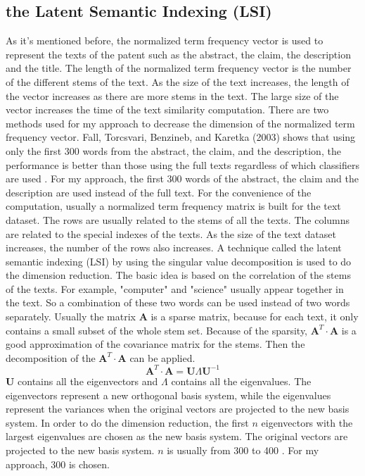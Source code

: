 \subsection{the Latent Semantic Indexing (LSI)}
As it's mentioned before, the normalized term frequency vector is used to represent the texts of the patent such as the abstract, the claim, the description and the title. The length of the normalized term frequency vector is the number of the different stems of the text. As the size of the text increases, the length of the vector increases as there are more stems in the text. The large size of the vector increases the time of the text similarity computation. There are two methods used for my approach to decrease the dimension of  the normalized term frequency vector. Fall, Torcsvari, Benzineb, and Karetka (2003) shows that  using only the first 300 words from the abstract, the claim, and the description, the performance is better than those using the full texts regardless of which classifiers are used \cite{tseng2007text}. For my approach, the first 300 words of the abstract, the claim and the description are used instead of the full text. For the convenience of the computation, usually a normalized term frequency matrix is built for the text dataset. The rows are usually related to the stems of all the texts. The columns are related to the special indexes of the texts. As the size of the text dataset increases, the number of the rows  also increases.  A technique called the latent semantic indexing (LSI) by using the singular value decomposition is used to do the dimension reduction. The basic idea is based on the correlation of the stems of the texts. For example, "computer" and "science" usually appear together in the text. So a combination of these two words can be used instead of two words separately. Usually the matrix $\textbf{A}$ is a sparse matrix, because for each text, it only contains a small subset of the whole stem set. Because of the sparsity, $\textbf{A}^T \cdot \textbf{A}$ is a good approximation of the covariance matrix for the stems. Then the decomposition of the $\textbf{A}^T \cdot \textbf{A}$ can be applied.
\begin{equation}
\textbf{A}^T \cdot \textbf{A} = \textbf{U}  \Lambda \textbf{U}^{-1}
\end{equation}
$\textbf{U}$ contains all the eigenvectors and $\Lambda$ contains all the eigenvalues. The eigenvectors represent a new orthogonal basis system, while the eigenvalues represent the variances when the original vectors are projected to the new basis system. In order to do the dimension reduction, the first $n$ eigenvectors with the largest eigenvalues are chosen as the new basis system. The original vectors are projected to the new basis system. $n$ is usually from 300 to 400 \cite{ASTCA}. For my approach, 300 is chosen. 

